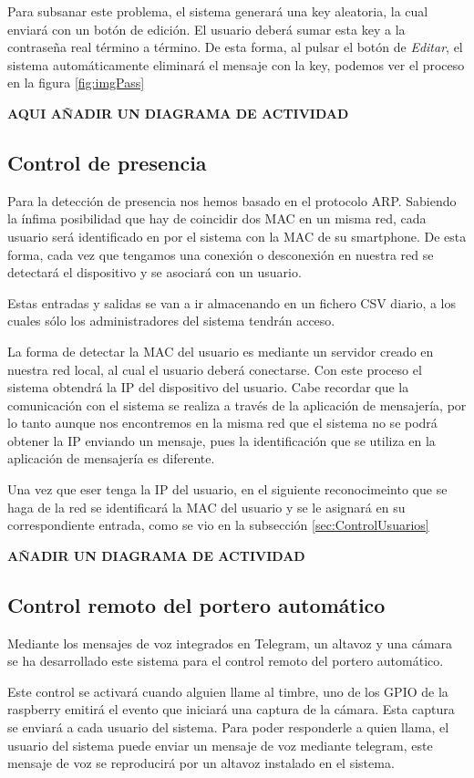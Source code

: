 \documentclass[10pt,journal,compsoc]{IEEEtran}
\begin{document}
Para subsanar este problema, el sistema generará una key aleatoria, la cual enviará con un 
botón de edición. El usuario deberá sumar esta key a la contraseña real término a término.
De esta forma, al pulsar el botón de \textit{Editar}, el sistema automáticamente eliminará el 
mensaje con la key, podemos ver el proceso en la figura \ref{fig:imgPass}

\textbf{AQUI AÑADIR UN DIAGRAMA DE ACTIVIDAD}

\subsection{Control de presencia}
Para la detección de presencia nos hemos basado en el protocolo ARP. Sabiendo la 
ínfima posibilidad que hay de coincidir dos MAC en un misma red, cada usuario 
será identificado en por el sistema con la MAC de su smartphone. De esta forma, 
cada vez que tengamos una conexión o desconexión en nuestra red se detectará el 
dispositivo y se asociará con un usuario.

Estas entradas y salidas se van a ir almacenando en un fichero CSV diario, a los 
cuales sólo los administradores del sistema tendrán acceso. 

La forma de detectar la MAC del usuario es mediante un servidor creado en 
nuestra red local, al cual el usuario deberá conectarse. Con este proceso el 
sistema obtendrá la IP del dispositivo del usuario. 
Cabe recordar que la comunicación con el sistema se realiza a través de la 
aplicación de mensajería, por lo tanto aunque nos encontremos en la misma red 
que el sistema no se podrá obtener la IP enviando un mensaje, pues la 
identificación que se utiliza en la aplicación de mensajería es diferente.

Una vez que eser tenga la IP del usuario, en el siguiente reconocimeinto que se 
haga de la red se identificará la MAC del usuario y se le asignará en su 
correspondiente entrada, como se vio en la subsección \ref{sec:ControlUsuarios}

\textbf{AÑADIR UN DIAGRAMA DE ACTIVIDAD}

\subsection{Control remoto del portero automático}
Mediante los mensajes de voz integrados en Telegram, un altavoz y una cámara se  
ha desarrollado este sistema para el control remoto del portero automático. 

Este control se activará cuando alguien llame al timbre, uno de los GPIO de la 
raspberry emitirá el evento que iniciará una captura de la cámara. Esta 
captura se enviará a cada usuario del sistema. 
Para poder responderle a quien llama, el usuario del sistema puede enviar un mensaje de voz mediante
telegram, este mensaje de voz se reproducirá por un altavoz instalado en el sistema.
\end{document}
